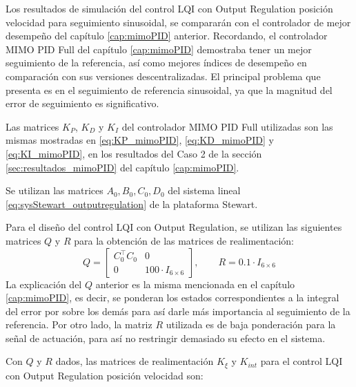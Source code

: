Los resultados de simulación del control LQI con Output Regulation posición velocidad para seguimiento sinusoidal, se compararán con el controlador de mejor desempeño del capítulo \ref{cap:mimoPID} anterior. Recordando, el controlador MIMO PID Full del capítulo \ref{cap:mimoPID} demostraba tener un mejor seguimiento de la referencia, así como mejores índices de desempeño en comparación con sus versiones descentralizadas. El principal problema que presenta es en el seguimiento de referencia sinusoidal, ya que la magnitud del error de seguimiento es significativo.

\begin{remark}
Las matrices $K_P$, $K_D$ y $K_I$ del controlador MIMO PID Full utilizadas son las mismas mostradas en \ref{eq:KP_mimoPID}, \ref{eq:KD_mimoPID} y \ref{eq:KI_mimoPID}, en los resultados del Caso 2 de la sección \ref{sec:resultados_mimoPID} del capítulo \ref{cap:mimoPID}.
\end{remark}

Se utilizan las matrices $A_0, B_0, C_0, D_0$ del sistema lineal \ref{eq:sysStewart_outputregulation} de la plataforma Stewart.

Para el diseño del control LQI con Output Regulation, se utilizan las siguientes matrices $Q$ y $R$ para la obtención de las matrices de realimentación:
\begin{equation}
    Q = \begin{bmatrix} C_0^\top C_0 & 0 \\ 0 & 100\cdot I_{6\times6} \end{bmatrix}, \qquad R = 0.1\cdot I_{6\times6} 
\end{equation}
La explicación del $Q$ anterior es la misma mencionada en el capítulo \ref{cap:mimoPID}, es decir, se ponderan los estados correspondientes a la integral del error por sobre los demás para así darle más importancia al seguimiento de la referencia. Por otro lado, la matriz $R$ utilizada es de baja ponderación para la señal de actuación, para así no restringir demasiado su efecto en el sistema.

Con $Q$ y $R$ dados, las matrices de realimentación $K_\xi$ y $K_{int}$ para el control LQI con Output Regulation posición velocidad son:

